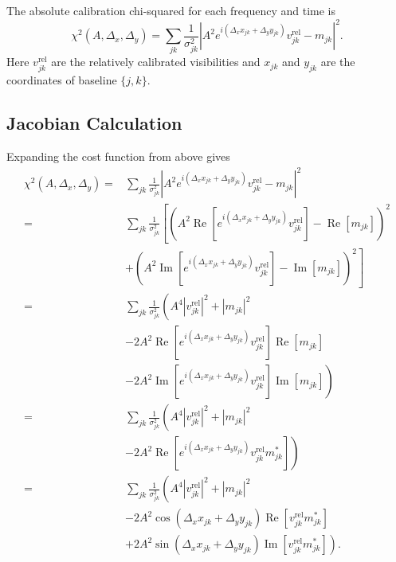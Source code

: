 \documentclass{article}
\newcommand\re{\operatorname{Re}}
\newcommand\im{\operatorname{Im}}
\begin{document}
The absolute calibration chi-squared for each frequency and time is
\begin{equation}
    \chi^2(A, \Delta_x, \Delta_y) = \sum_{jk} \frac{1}{\sigma_{jk}^2} \left| A^2 e^{i(\Delta_x x_{jk} + \Delta_y y_{jk})} v^\text{rel}_{jk} - m_{jk} \right|^2.
\end{equation}
Here $v^\text{rel}_{jk}$ are the relatively calibrated visibilities and $x_{jk}$ and $y_{jk}$ are the coordinates of baseline $\{j, k\}$.

\subsection{Jacobian Calculation}

Expanding the cost function from above gives
\begin{equation}
\begin{split}
    \chi^2(A, \Delta_x, \Delta_y) =& \sum_{jk} \frac{1}{\sigma_{jk}^2} \left| A^2 e^{i(\Delta_x x_{jk} + \Delta_y y_{jk})} v^\text{rel}_{jk} - m_{jk} \right|^2 \\
    =& \sum_{jk} \frac{1}{\sigma_{jk}^2} \left[ \left( A^2 \re[ e^{i(\Delta_x x_{jk} + \Delta_y y_{jk})} v^\text{rel}_{jk} ] - \re[m_{jk}] \right)^2 \right. \\
    &+ \left. \left( A^2 \im[ e^{i(\Delta_x x_{jk} + \Delta_y y_{jk})} v^\text{rel}_{jk} ] - \im[m_{jk}] \right)^2 \right] \\
    =& \sum_{jk} \frac{1}{\sigma_{jk}^2} \left( A^4 |v^\text{rel}_{jk}|^2 + |m_{jk}|^2 \right. \\
    &- 2 A^2 \re[ e^{i(\Delta_x x_{jk} + \Delta_y y_{jk})} v^\text{rel}_{jk} ] \re[m_{jk}] \\
    &- \left. 2 A^2 \im[ e^{i(\Delta_x x_{jk} + \Delta_y y_{jk})} v^\text{rel}_{jk} ] \im[m_{jk}] \right) \\
    =& \sum_{jk} \frac{1}{\sigma_{jk}^2} \left( A^4 |v^\text{rel}_{jk}|^2 + |m_{jk}|^2 \right. \\
    &- \left. 2 A^2 \re[ e^{i(\Delta_x x_{jk} + \Delta_y y_{jk})} v^\text{rel}_{jk} m^*_{jk}] \right) \\
    =& \sum_{jk} \frac{1}{\sigma_{jk}^2} \left( A^4 |v^\text{rel}_{jk}|^2 + |m_{jk}|^2 \right. \\
    &- 2 A^2 \cos(\Delta_x x_{jk} + \Delta_y y_{jk}) \re[v^\text{rel}_{jk} m^*_{jk}] \\
    &+ \left. 2 A^2 \sin(\Delta_x x_{jk} + \Delta_y y_{jk}) \im[v^\text{rel}_{jk} m^*_{jk}] \right). \\
\end{split}
\end{equation}
\end{document}
